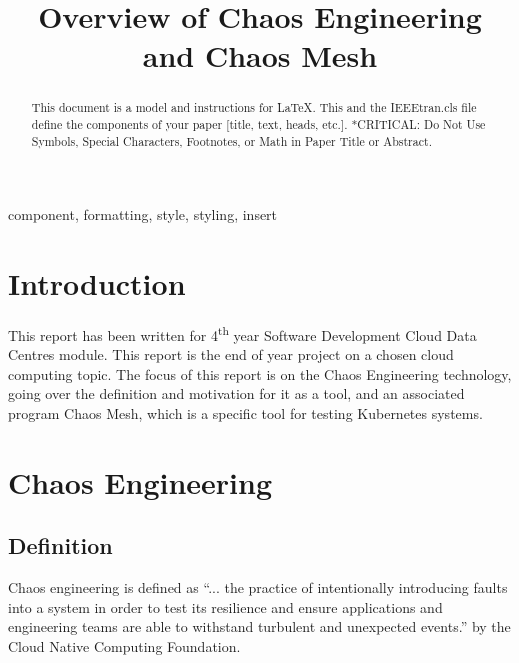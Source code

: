 \documentclass[conference]{IEEEtran}
\begin{document}
\title{Overview of Chaos Engineering and Chaos Mesh}

\author{
}

\maketitle

\begin{abstract}
This document is a model and instructions for \LaTeX.
This and the IEEEtran.cls file define the components of your paper [title, text, heads, etc.]. *CRITICAL: Do Not Use Symbols, Special Characters, Footnotes, 
or Math in Paper Title or Abstract.
\end{abstract}

\begin{IEEEkeywords}
component, formatting, style, styling, insert
\end{IEEEkeywords}

\section{Introduction}
This report has been written for 4\textsuperscript{th} year Software Development Cloud Data Centres module. This report is the end of year project on a chosen cloud computing topic. The focus of this report is on the Chaos Engineering technology, going over the definition and motivation for it as a tool, and an associated program Chaos Mesh, which is a specific tool for testing Kubernetes systems.

\section{Chaos Engineering}
\subsection{Definition}

Chaos engineering is defined as ``... the practice of intentionally introducing faults into a system in order to test its resilience and ensure applications and engineering teams are able to withstand turbulent and unexpected events.'' by the Cloud Native Computing Foundation. \cite{b1}
\end{document}
